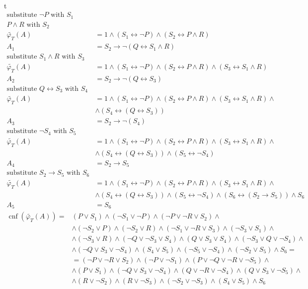 \documentclass[a4paper,12pt]{article}
\DeclareMathOperator{\cnf}{cnf}
\begin{document}
\begin{enumerate}
\begin{align*}
		\end{align*}t
		\begin{align*}
			\textrm{substitute } \neg P\textrm{ with }S_1&&\\P\land R\textrm{ with }S_2&&\\
			\tilde{\varphi_T}(A)&=1\land(S_1\leftrightarrow\neg P)\land(S_2\leftrightarrow P\land R)&\\A_1&=S_2\to\neg(Q\leftrightarrow S_1\land R)&\\\textrm{substitute } S_1\land R\textrm{ with }S_3&&\\\tilde{\varphi_T}(A)&=1\land(S_1\leftrightarrow\neg P)\land(S_2\leftrightarrow P\land R)\land(S_3\leftrightarrow S_1\land R)&\\A_2&=S_2\to\neg(Q\leftrightarrow S_3)&\\\textrm{substitute } Q\leftrightarrow S_3\textrm{ with }S_4&&\\\tilde{\varphi_T}(A)&=1\land(S_1\leftrightarrow\neg P)\land(S_2\leftrightarrow P\land R)\land(S_3\leftrightarrow S_1\land R)\land&\\&\land(S_4\leftrightarrow(Q\leftrightarrow S_3))&\\A_3&=S_2\to\neg(S_4)&\\\textrm{substitute } \neg S_4\textrm{ with }S_5&&\\\tilde{\varphi_T}(A)&=1\land(S_1\leftrightarrow\neg P)\land(S_2\leftrightarrow P\land R)\land(S_3\leftrightarrow S_1\land R)\land&\\&\land(S_4\leftrightarrow(Q\leftrightarrow S_3))\land(S_5\leftrightarrow \neg S_4) &\\A_4&=S_2\to S_5&\\\textrm{substitute } S_2\to S_5\textrm{ with }S_6\\\tilde{\varphi_T}(A)&=1\land(S_1\leftrightarrow\neg P)\land(S_2\leftrightarrow P\land R)\land(S_3\leftrightarrow S_1\land R)\land&\\&\land(S_4\leftrightarrow(Q\leftrightarrow S_3))\land(S_5\leftrightarrow \neg S_4)\land(S_6\leftrightarrow (S_2\to S_5))\land S_6 &\\ A_5&=S_6&
		\end{align*}
		\begin{align*}
			\cnf(\tilde{\varphi_T}(A))=& (P \lor S_1) \land (\neg S_1 \lor \neg P) \land (\neg P \lor \neg R \lor S_2) \land\\&\land (\neg S_2 \lor P) \land (\neg S_2 \lor R) \land (\neg S_1 \lor \neg R \lor S_3) \land (\neg S_3 \lor S_1) \land\\&\land (\neg S_3 \lor R) \land (\neg Q \lor \neg S_3 \lor S_4) \land (Q \lor S_3 \lor S_4) \land (\neg S_3 \lor Q \lor \neg S_4) \land\\&\land (\neg Q \lor S_3 \lor \neg S_4) \land (S_4 \lor S_5) \land (\neg S_5 \lor \neg S_4) \land (\neg S_2 \lor S_5) \land S_6=\\&=(\neg P\lor\neg R\lor S_2)\land(\neg P\lor \neg S_1)\land(P\lor\neg Q\lor\neg R\lor\neg S_5)\land\\&\land (P\lor S_1)\land(\neg Q\lor S_3\lor\neg S_4)\land (Q\lor\neg R\lor\neg S_4)\land(Q\lor S_3\lor\neg S_5)\land\\&\land(R\lor\neg S_2)\land(R\lor\neg S_3)\land(\neg S_2\lor\neg S_3)\land(S_4\lor S_5)\land S_6  

\end{align*}
\end{enumerate}
\end{document}
